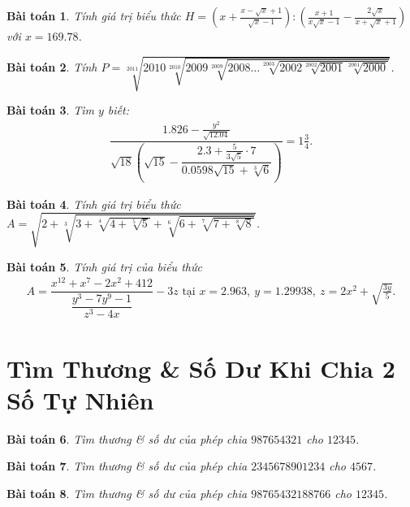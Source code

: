 \documentclass{article}
\newtheorem{baitoan}{Bài toán}
\begin{document}
\begin{baitoan}
	Tính giá trị biểu thức $H = \left(x + \frac{x - \sqrt{x} + 1}{\sqrt{x} - 1}\right):\left(\frac{x + 1}{x\sqrt{x} - 1} - \frac{2\sqrt{x}}{x + \sqrt{x} + 1}\right)$ với $x = 169.78$.
\end{baitoan}

\begin{baitoan}
	Tính $P = \sqrt[2011]{2010\sqrt[2010]{2009\sqrt[2009]{2008\ldots\sqrt[2003]{2002\sqrt[2002]{2001}\sqrt[2001]{2000}}}}}$.
\end{baitoan}

\begin{baitoan}
	Tìm $y$ biết:
	\begin{align*}
		\dfrac{1.826 - \frac{y^2}{\sqrt{12.04}}}{\sqrt{18}\left(\sqrt{15} - \dfrac{2.3 + \frac{5}{3\sqrt{5}}\cdot7}{0.0598\sqrt{15} + \sqrt[3]{6}}\right)} = 1\frac{3}{4}.
	\end{align*}
\end{baitoan}

\begin{baitoan}
	Tính giá trị biểu thức $A = \sqrt{2 + \sqrt[3]{3 + \sqrt[4]{4 + \sqrt[5]{5}} + \sqrt[6]{6 + \sqrt[7]{7 + \sqrt[8]{8}}}}}$.
\end{baitoan}

\begin{baitoan}
	Tính giá trị của biểu thức
	\begin{align*}
		A = \dfrac{x^{12} + x^7 - 2x^2 + 412}{\dfrac{y^3 - 7y^9 - 1}{z^3 - 4x}} - 3z\mbox{ tại } x = 2.963,\ y = 1.29938,\ z = 2x^2 + \sqrt{\frac{3y}{5}}.
	\end{align*}
\end{baitoan}


\section{Tìm Thương \& Số Dư Khi Chia 2 Số Tự Nhiên}

\begin{baitoan}
	Tìm thương \& số dư của phép chia $987654321$ cho $12345$.
\end{baitoan}

\begin{baitoan}
	Tìm thương \& số dư của phép chia $2345678901234$ cho $4567$.
\end{baitoan}

\begin{baitoan}
	Tìm thương \& số dư của phép chia $98765432188766$ cho $12345$.
\end{baitoan}
\end{document}
